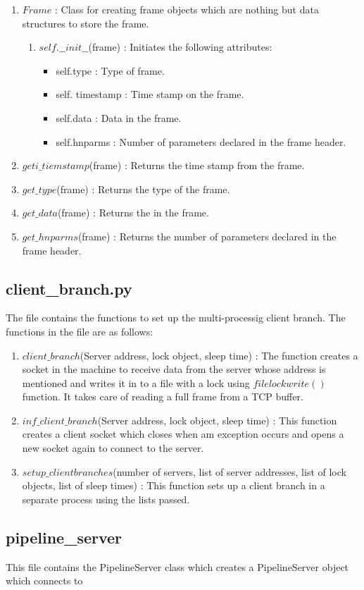 \begin{enumerate}
\begin{enumerate}
		\end{enumerate}
	\item $Frame$ : Class for creating frame objects which are nothing but data
		structures to store the frame.
		\begin{enumerate}
			\item $self.\_\_init\_\_$(frame) : Initiates the following attributes:
				\begin{itemize}
					\item self.type : Type of frame.
					\item self. timestamp : Time stamp on the frame.
					\item self.data : Data in the frame.
					\item self.hnparms : Number of parameters declared in the
						frame header.
				\end{itemize}
		\end{enumerate}
	\item $geti\_tiemstamp$(frame) : Returns the time stamp from the frame.
	\item $get\_type$(frame) : Returns the type of the frame.
	\item $get\_data$(frame) : Returns the in the frame.
	\item $get\_hnparms$(frame) : Returns the number of parameters declared in
		the frame header.
\end{enumerate}


\subsection{client\_branch.py}
The file contains the functions to set up the multi-processig client branch.
The functions in the file are as follows:
\begin{enumerate}
	\item $client\_branch$(Server address, lock object, sleep time) : The
		function creates a socket in the machine to receive data from the
		server whose address is mentioned and writes it in to a file with a
		lock using $filelockwrite()$ function. It takes care of reading a full
		frame from a TCP buffer.
	\item $inf\_client\_branch$(Server address, lock object, sleep time) : This
		function creates a client socket which closes when am exception occurs
		and opens a new socket again to connect to the server.
	\item $setup\_clientbranches$(number of servers, list of server addresses,
		list of lock objects, list of sleep times) : This function sets up a
		client branch in a separate process using the lists passed.
\end{enumerate}


\subsection{pipeline\_server}
This file contains the PipelineServer class which creates a PipelineServer
object which connects to
